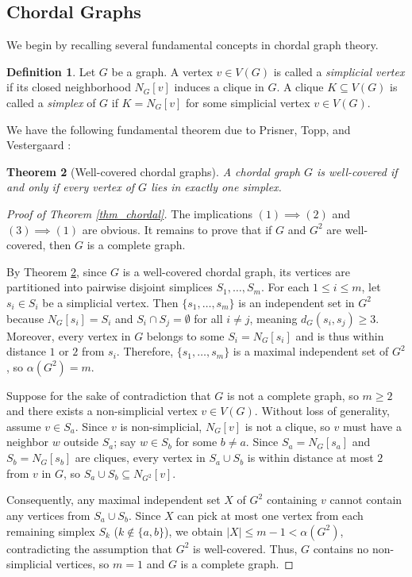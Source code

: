 \documentclass[10pt,a4paper]{amsart}
\numberwithin{equation}{section}
\newtheorem{thm}{\bf Theorem}[section]
\theoremstyle{definition}
\newtheorem{defn}[thm]{Definition}
\begin{document}
\subsection{Chordal Graphs}
We begin by recalling several fundamental concepts in chordal graph theory.

\begin{defn}
Let $G$ be a graph. A vertex $v \in V(G)$ is called a \emph{simplicial vertex} if its closed neighborhood $N_G[v]$ induces a clique in $G$. A clique $K \subseteq V(G)$ is called a \emph{simplex} of $G$ if $K = N_G[v]$ for some simplicial vertex $v \in V(G)$.
\end{defn}
We have the following fundamental theorem due to Prisner, Topp, and Vestergaard \cite{PTV}:

\begin{thm}[Well-covered chordal graphs]\label{thm_well_covered_chordal}
A chordal graph $G$ is well-covered if and only if every vertex of $G$ lies in exactly one simplex.
\end{thm}


\begin{proof}[Proof of Theorem \ref{thm_chordal}] 
The implications $(1) \implies (2)$ and $(3) \implies (1)$ are obvious. It remains to prove that if $G$ and $G^2$ are well-covered, then $G$ is a complete graph. 

By Theorem \ref{thm_well_covered_chordal}, since $G$ is a well-covered chordal graph, its vertices are partitioned into pairwise disjoint simplices $S_1, \ldots, S_m$. For each $1 \le i \le m$, let $s_i \in S_i$ be a simplicial vertex. Then $\{s_1, \ldots, s_m\}$ is an independent set in $G^2$ because $N_G[s_i] = S_i$ and $S_i \cap S_j = \emptyset$ for all $i \neq j$, meaning $d_G(s_i, s_j) \ge 3$. Moreover, every vertex in $G$ belongs to some $S_i = N_G[s_i]$ and is thus within distance $1$ or $2$ from $s_i$. Therefore, $\{s_1, \ldots, s_m\}$ is a maximal independent set of $G^2$, so $\alpha(G^2) = m$.

Suppose for the sake of contradiction that $G$ is not a complete graph, so $m \ge 2$ and there exists a non-simplicial vertex $v \in V(G)$. Without loss of generality, assume $v \in S_a$. Since $v$ is non-simplicial, $N_G[v]$ is not a clique, so $v$ must have a neighbor $w$ outside $S_a$; say $w \in S_b$ for some $b \neq a$. Since $S_a = N_G[s_a]$ and $S_b = N_G[s_b]$ are cliques, every vertex in $S_a \cup S_b$ is within distance at most $2$ from $v$ in $G$, so $S_a \cup S_b \subseteq N_{G^2}[v]$. 

Consequently, any maximal independent set $X$ of $G^2$ containing $v$ cannot contain any vertices from $S_a \cup S_b$. Since $X$ can pick at most one vertex from each remaining simplex $S_k$ ($k \notin \{a, b\}$), we obtain $|X| \le m - 1 < \alpha(G^2)$, contradicting the assumption that $G^2$ is well-covered. Thus, $G$ contains no non-simplicial vertices, so $m = 1$ and $G$ is a complete graph.
\end{proof}
\end{document}
